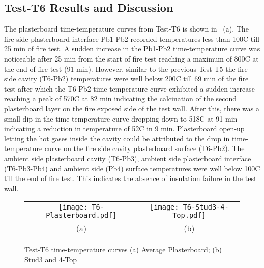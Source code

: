 \subsection{Test-T6 Results and Discussion}

The plasterboard time-temperature curves from Test-T6 is shown in ~(a). The fire side plasterboard interface Pb1-Pb2 recorded temperatures less than 100\degree C till 25 min of fire test. A sudden increase in the Pb1-Pb2 time-temperature curve was noticeable after 25 min from the start of fire test reaching a maximum of 800\degree C at the end of fire test (91 min). However, similar to the previous Test-T5 the fire side cavity (T6-Pb2) temperatures were well below 200\degree C till 69 min of the fire test after which the T6-Pb2 time-temperature curve exhibited a sudden increase reaching a peak of 570\degree C at 82 min indicating the calcination of the second plasterboard layer on the fire exposed side of the test wall. After this, there was a small dip in the time-temperature curve dropping down to 518\degree C at 91 min indicating a reduction in temperature of 52\degree C in 9 min. Plasterboard open-up letting the hot gases inside the cavity could be attributed to the drop in time-temperature curve on the fire side cavity plasterboard surface (T6-Pb2). The ambient side plasterboard cavity (T6-Pb3), ambient side plasterboard interface (T6-Pb3-Pb4) and ambient side (Pb4) surface temperatures were well below 100\degree C till the end of fire test. This indicates the absence of insulation failure in the test wall.
\begin{figure}[!htbp]
	\centering	
		\begin{tabular}{cc}
			\texttt{[image: T6-Plasterboard.pdf]} & \texttt{[image: T6-Stud3-4-Top.pdf]} \\
			(a) & (b) \\
			\end{tabular}
		\caption{Test-T6 time-temperature curves (a) Average Plasterboard; (b) Stud3 and 4-Top}
		\label{fig:T6-time-temperature}
\end{figure}

